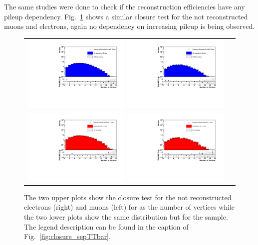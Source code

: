 \clearpage
The same studies were done to check if the reconstruction efficiencies have any pileup dependency. Fig.~\ref{fig:pileup_reco} shows a similar closure test for the not reconstructed muons and electrons, again no dependency on increasing pileup is being observed.
\begin{figure}[tbhn]
\begin{center}
\begin{tabular}{cc}
\includegraphics[width=0.49\textwidth]{lostlepton/plots/closure/NVttbarRecoE.pdf}
\includegraphics[width=0.49\textwidth]{lostlepton/plots/closure/NVttbarRecoMu.pdf}\\
\includegraphics[width=0.49\textwidth]{lostlepton/plots/closure/NVwRecoE.pdf}
\includegraphics[width=0.49\textwidth]{lostlepton/plots/closure/NVwRecoMu.pdf}\\
\end{tabular}
\end{center}
\caption{The two upper plots show the closure test for the not reconstructed electrons (right) and muons (left) for \ttbar as the number of vertices while the two lower plots show the same distribution but for the \wpj sample. The legend description can be found in the caption of Fig.~\ref{fig:closure_sepTTbar}.}
\label{fig:pileup_reco}
\end{figure}
